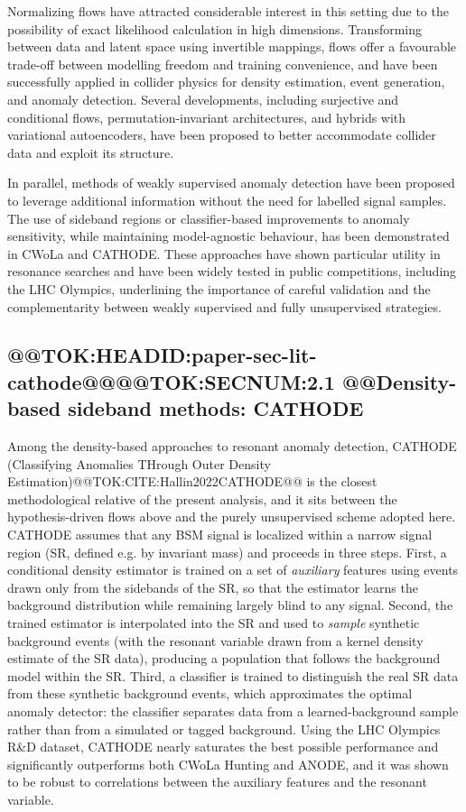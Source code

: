 \documentclass[11pt]{article}
\begin{document}
Normalizing flows have attracted considerable interest in this setting due to the possibility of exact likelihood calculation in high dimensions. Transforming between data and latent space using invertible mappings, flows offer a favourable trade-off between modelling freedom and training convenience, and have been successfully applied in collider physics for density estimation, event generation, and anomaly detection. Several developments, including surjective and conditional flows, permutation-invariant architectures, and hybrids with variational autoencoders, have been proposed to better accommodate collider data and exploit its structure.

In parallel, methods of weakly supervised anomaly detection have been proposed to leverage additional information without the need for labelled signal samples. The use of sideband regions or classifier-based improvements to anomaly sensitivity, while maintaining model-agnostic behaviour, has been demonstrated in CWoLa and CATHODE. These approaches have shown particular utility in resonance searches and have been widely tested in public competitions, including the LHC Olympics, underlining the importance of careful validation and the complementarity between weakly supervised and fully unsupervised strategies.

\subsection{@@TOK:HEADID:paper-sec-lit-cathode@@@@TOK:SECNUM:2.1 @@Density-based sideband methods: CATHODE}

Among the density-based approaches to resonant anomaly detection, CATHODE (Classifying Anomalies THrough Outer Density Estimation)@@TOK:CITE:Hallin2022CATHODE@@ is the closest methodological relative of the present analysis, and it sits between the hypothesis-driven flows above and the purely unsupervised scheme adopted here. CATHODE assumes that any BSM signal is localized within a narrow signal region (SR, defined e.g. by invariant mass) and proceeds in three steps. First, a conditional density estimator is trained on a set of \emph{auxiliary} features using events drawn only from the sidebands of the SR, so that the estimator learns the background distribution while remaining largely blind to any signal. Second, the trained estimator is interpolated into the SR and used to \emph{sample} synthetic background events (with the resonant variable drawn from a kernel density estimate of the SR data), producing a population that follows the background model within the SR. Third, a classifier is trained to distinguish the real SR data from these synthetic background events, which approximates the optimal anomaly detector: the classifier separates data from a learned-background sample rather than from a simulated or tagged background. Using the LHC Olympics R\&D dataset, CATHODE nearly saturates the best possible performance and significantly outperforms both CWoLa Hunting and ANODE, and it was shown to be robust to correlations between the auxiliary features and the resonant variable.
\end{document}
